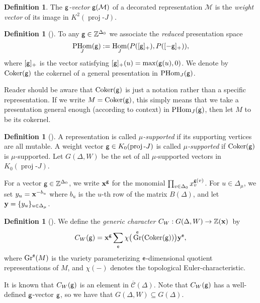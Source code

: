 \documentclass{amsart}
\theoremstyle{definition}
\newtheorem{definition}[theorem]{Definition}
\theoremstyle{remark}
\numberwithin{equation}{section}
\DeclareMathOperator{\Coker}{Coker}
\DeclareMathOperator{\Gr}{Gr}
\DeclareMathOperator{\Hom}{Hom}
\DeclareMathOperator{\PHom}{PHom}
\newcommand{\mc}[1]{\mathcal{#1}}
\newcommand{\mb}[1]{\mathbb{#1}}
\renewcommand{\b}[1]{\bold{#1}}
\newcommand{\br}[1]{\overline{#1}}
\newcommand{\e}{{\sf e}}
\newcommand{\g}{{\sf g}}
\newcommand{\proj}{\operatorname{proj}\text{-}}
\newcommand{\uca}{\br{\mc{C}}}
\begin{document}
\begin{definition} The {\em $\g$-vector} $\g(\mc{M})$ of a decorated representation $\mc{M}$ is the {\em weight vector} of its image in $K^2(\proj J)$.
\end{definition}


\begin{definition}[\cite{DF}]
	To any $\g\in\mathbb{Z}^{\Delta_0}$ we associate the {\em reduced} presentation space $$\PHom_J(\g):=\Hom_J(P([\g]_+),P([-\g]_+)),$$
	where $[\g]_+$ is the vector satisfying $[\g]_+(u) = \max(\g(u),0)$.
	We denote by $\Coker(\g)$ the cokernel of a general presentation in $\PHom_J(\g)$.
\end{definition}
\noindent Reader should be aware that $\Coker(\g)$ is just a notation rather than a specific representation.
If we write $M=\Coker(\g)$, this simply means that we take a presentation general enough (according to context) in $\PHom_J(\g)$, 
then let $M$ to be its cokernel.


\begin{definition}[{\cite{Fs1}}] \label{D:mu_supg}
	A representation is called {\em $\mu$-supported} if its supporting vertices are all mutable.
	A weight vector $\g\in K_0(\proj J)$ is called {\em $\mu$-supported} if $\Coker(\g)$ is $\mu$-supported.
	Let $G(\Delta,W)$ be the set of all $\mu$-supported vectors in $K_0(\proj J)$.
\end{definition}

For a vector $\g\in \mb{Z}^{\Delta_0}$, we write $\b{x}^\g$ for the monomial $\prod_{v\in \Delta_0} x_v^{\g(v)}$.
For $u\in\Delta_\mu$, we set ${y}_u= \b{x}^{-b_{u}}$ where $b_u$ is the $u$-th row of the matrix $B(\Delta)$,
and let ${\b{y}}=\{{y}_u\}_{u\in\Delta_\mu}$.
\begin{definition}[\cite{P}]
	We define the {\em generic character} $C_W:G(\Delta,W)\to \mb{Z}(\b{x})$~by
	\begin{equation*} \label{eq:genCC}
	C_W(\g)=\b{x}^{\g} \sum_{\e} \chi\big(\Gr^{\e}(\Coker(\g)) \big) {\b{y}}^{\e},
	\end{equation*}
	where $\Gr^{\e}(M)$ is the variety parameterizing $\e$-dimensional quotient representations of $M$, and $\chi(-)$ denotes the topological Euler-characteristic.
\end{definition}
\noindent It is known \cite[Lemma 5.3]{Fs1} that $C_W(\g)$ is an element in $\uca(\Delta)$.
Note that $C_W(\g)$ has a well-defined $\g$-vector $\g$, so we have that $G(\Delta,W)\subseteq G(\Delta)$.
\end{document}
